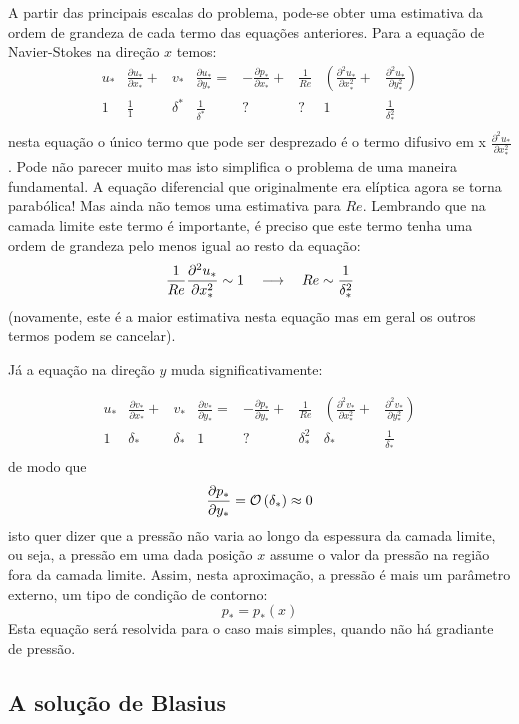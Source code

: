A partir das principais escalas do problema, pode-se obter uma estimativa da ordem de grandeza de cada termo das equações anteriores. Para a equação de Navier-Stokes na direção $x$ temos:
\[
\begin{matrix}
 u_*&\frac{\partial u_*}{\partial x_*} + &v_*&\frac{\partial u_*}{\partial y_*} =& 
-\frac{\partial p_*}{\partial x_*} + &\frac{1}{Re} &\left( \frac{\partial^2 u_*}{\partial x_*^2}\right. +& \left.\frac{\partial^2 u_*}{\partial y_*^2}\right) \\
1 & \frac{1}{1} & \delta^* & \frac{1}{\delta^*} & ? & ? & 1 & \frac{1}{\delta_*^2} \\
\end{matrix}
\]
nesta equação o único termo que pode ser desprezado é o termo difusivo em x $\frac{\partial^2 u_*}{\partial x_*^2}$. Pode não parecer muito mas isto simplifica o problema de uma maneira fundamental. A equação diferencial que originalmente era elíptica agora se torna parabólica! Mas ainda não temos uma estimativa para $Re$. Lembrando que na camada limite este termo é importante, é preciso que este termo tenha uma ordem de grandeza pelo menos igual ao resto da equação:
\[
\frac{1}{Re} \frac{\partial^2 u_*}{\partial x_*^2} \sim 1 \quad\longrightarrow\quad Re \sim \frac{1}{\delta_*^2}
\]
(novamente, este é a maior estimativa nesta equação mas em geral os outros termos podem se cancelar).

Já a equação na direção $y$ muda significativamente:

\[
\begin{matrix}
u_*&\frac{\partial v_*}{\partial x_*} + &v_*&\frac{\partial v_*}{\partial y_*} =& 
-\frac{\partial p_*}{\partial y_*} + &\frac{1}{Re} &\left( \frac{\partial^2 v_*}{\partial x_*^2}\right. +& \left.\frac{\partial^2 v_*}{\partial y_*^2}\right) \\
 1 & \delta_* & \delta_* & 1 & ? & \delta_*^2 & \delta_* & \frac{1}{\delta_*} \\
\end{matrix}
\]
de modo que 
\[
\frac{\partial p_*}{\partial y_*} = \mathcal{O}\left(\delta_*\right) \approx 0
\]
isto quer dizer que a pressão não varia ao longo da espessura da camada limite, ou seja, a pressão em uma dada posição $x$ assume o valor da pressão na região fora da camada limite. Assim, nesta aproximação, a pressão é mais um parâmetro externo, um tipo de condição de contorno:
\[
p_* = p_*(x)
\]
Esta equação será resolvida para o caso mais simples, quando não há gradiante de pressão.

\subsection{A solução de Blasius}

